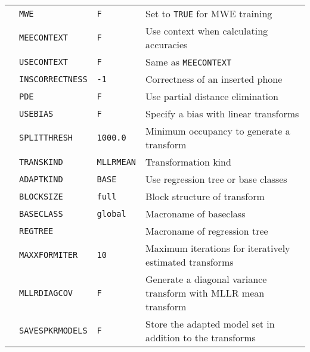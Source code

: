 \begin{center}
\begin{supertabular}{|p{1.8cm}|l|l|p{6.6cm}|}
  & \texttt{MWE} & \texttt{F} & Set to \texttt{TRUE} for MWE training \\ 


  & \texttt{MEECONTEXT} & \texttt{F} & Use context when calculating accuracies \\ 


  & \texttt{USECONTEXT} & \texttt{F} & Same as \texttt{MEECONTEXT} \\ 


  & \texttt{INSCORRECTNESS} & \texttt{-1} & Correctness of an inserted phone \\ 


  & \texttt{PDE} & \texttt{F} & Use partial distance elimination \\ \hline







  & \texttt{USEBIAS} & \texttt{F} & Specify a bias with linear transforms \\ 


  & \texttt{SPLITTHRESH} & \texttt{1000.0} & Minimum occupancy to generate a transform \\ 


  & \texttt{TRANSKIND} & \texttt{{\tt MLLRMEAN}} & Transformation kind \\ 


  & \texttt{ADAPTKIND} & \texttt{{\tt BASE}} & Use regression tree or base classes \\ 


  & \texttt{BLOCKSIZE} & \texttt{full} & Block structure of transform\\ 


  & \texttt{BASECLASS} & \texttt{global} & Macroname of baseclass\\ 


  & \texttt{REGTREE} & \texttt{} & Macroname of regression tree\\ 


   & \texttt{MAXXFORMITER} & \texttt{10} & Maximum iterations for iteratively estimated transforms \\ 


  & \texttt{MLLRDIAGCOV} & \texttt{F} & Generate a diagonal variance transform with MLLR mean transform \\ 


  & \texttt{SAVESPKRMODELS} & \texttt{F} & Store the adapted model set in addition to the transforms \\ 



\end{supertabular}
\end{center}
